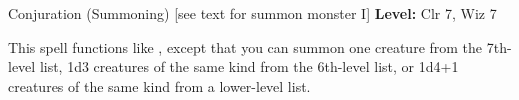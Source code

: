 {Conjuration (Summoning) [see text for summon monster I]}
{
	\textbf{Level:}
	Clr 7, Wiz 7\\
}
{
	This spell functions like , except that you can summon one creature from the 7th-level list, 1d3 creatures of the same kind from the 6th-level list, or 1d4+1 creatures of the same kind from a lower-level list.

}
